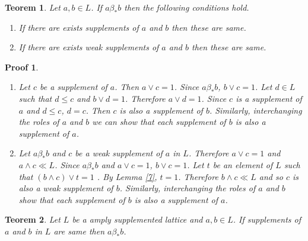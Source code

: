\documentclass[a4paper,12pt]{article}
\numberwithin{equation}{section}
\theoremstyle{italik}
\newtheorem{teorem}{Teorem}[section]
\newtheorem*{ispat}{Proof}
\begin{document}
\begin{teorem}\label{8}
  Let $ a,b \in L $. If $ a\beta_* b $ then the following conditions hold.
  \begin{enumerate}[label=(\roman{*}), ref=(\roman{*})]
      \item
        If there are exists supplements of $ a $ and $ b $ then these are same. \label{8.1}
      \item
        If there are exists weak supplements of $ a $ and $ b $ then these are same. \label{8.2}
    \end{enumerate}
\end{teorem}
\begin{ispat}
  \begin{enumerate}
    \item
      Let $ c $ be a supplement of $ a $. Then $ a \vee c = 1 $. Since $ a \beta_* b $, $ b \vee c=1 $.
      Let $ d \in L $ such that $ d \leq c $ and $ b \vee d = 1 $. Therefore 
      $ a \vee d = 1 $. Since $ c $ is a supplement of $ a $ and $ d \leq c $, $ d = c $. Then 
      $ c $ is also a supplement of $ b $. Similarly, interchanging the roles of $ a $ and $ b $ 
      we can show that each supplement of $ b $ is also a supplement of $ a $.
    \item
      Let $ a \beta_* b $ and $ c $ be a weak supplement of $ a $ in $ L $. Therefore $ a \vee c = 1 $ 
      and $ a \wedge c \ll L $. Since $ a \beta_* b $ and $ a \vee c = 1 $, $ b \vee c = 1 $. 
      Let $ t $ be an element of $ L $ such that $ (b \wedge c ) \vee t = 1 $ . By Lemma \ref{7}, 
      $ t = 1 $. Therefore $ b \wedge c \ll L $ and so $ c $ is also a weak supplement of $ b $. 
      Similarly, interchanging the roles of $ a $ and $ b $ show that each supplement of $ b $ 
      is also a supplement of $ a $.
  \end{enumerate}
\end{ispat}




\begin{teorem}\label{9}
  Let $ L $ be a amply supplemented lattice and $ a,b \in L $. If supplements of $ a $ and $ b $ in $ L $ 
  are same then $ a \beta_* b $.
\end{teorem}
\end{document}
